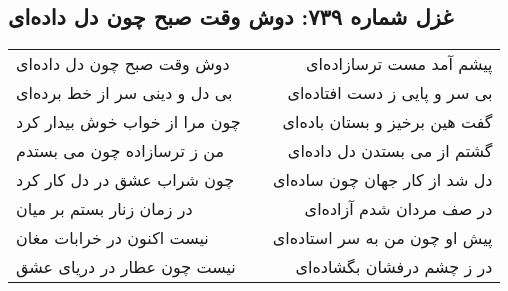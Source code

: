 \begin{center}
\section*{غزل شماره ۷۳۹: دوش وقت صبح چون دل داده‌ای}
\label{sec:739}
\begin{longtable}{l p{0.5cm} r}
دوش وقت صبح چون دل داده‌ای
&&
پیشم آمد مست ترسازاده‌ای
\\
بی دل و دینی سر از خط برده‌ای
&&
بی سر و پایی ز دست افتاده‌ای
\\
چون مرا از خواب خوش بیدار کرد
&&
گفت هین برخیز و بستان باده‌ای
\\
من ز ترسازاده چون می بستدم
&&
گشتم از می بستدن دل داده‌ای
\\
چون شراب عشق در دل کار کرد
&&
دل شد از کار جهان چون ساده‌ای
\\
در زمان زنار بستم بر میان
&&
در صف مردان شدم آزاده‌ای
\\
نیست اکنون در خرابات مغان
&&
پیش او چون من به سر استاده‌ای
\\
نیست چون عطار در دریای عشق
&&
در ز چشم درفشان بگشاده‌ای
\\
\end{longtable}
\end{center}
